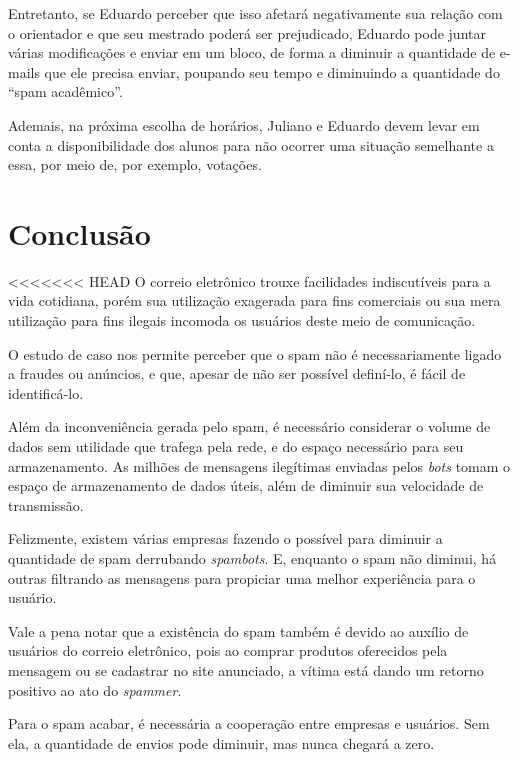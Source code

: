 \documentclass[a4paper,dvipdfm]{article}
\begin{document}
		Entretanto, se Eduardo perceber que isso afetará negativamente sua relação com o orientador e que seu mestrado poderá ser prejudicado, Eduardo pode juntar várias modificações e enviar em um bloco, de forma a diminuir a quantidade de e-mails que ele precisa enviar, poupando seu tempo e diminuindo a quantidade do ``spam acadêmico''.
		
		Ademais, na próxima escolha de horários, Juliano e Eduardo devem levar em conta a disponibilidade dos alunos para não ocorrer uma situação semelhante a essa, por meio de, por exemplo, votações.
		
\newpage
\section{Conclusão}
<<<<<<< HEAD
	O correio eletrônico trouxe facilidades indiscutíveis para a vida cotidiana, porém sua utilização exagerada para fins comerciais ou sua mera utilização para fins ilegais incomoda os usuários deste meio de comunicação.
	
	O estudo de caso nos permite perceber que o spam não é necessariamente ligado a fraudes ou anúncios, e que, apesar de não ser possível definí-lo, é fácil de identificá-lo.
	
	Além da inconveniência gerada pelo spam, é necessário considerar o volume de dados sem utilidade que trafega pela rede, e do espaço necessário para seu armazenamento.
	As milhões de mensagens ilegítimas enviadas pelos \emph{bots} tomam o espaço de armazenamento de dados úteis, além de diminuir sua velocidade de transmissão.
	
	Felizmente, existem várias empresas fazendo o possível para diminuir a quantidade de spam derrubando \emph{spambots}.
	E, enquanto o spam não diminui, há outras filtrando as mensagens para propiciar uma melhor experiência para o usuário.

	Vale a pena notar que a existência do spam também é devido ao auxílio de usuários do correio eletrônico, pois ao comprar produtos oferecidos pela mensagem ou se cadastrar no site anunciado, a vítima está dando um retorno positivo ao ato do \emph{spammer}.

	Para o spam acabar, é necessária a cooperação entre empresas e usuários. Sem ela, a quantidade de envios pode diminuir, mas nunca chegará a zero.

\newpage
\printglossaries
{}

\newpage



%
\end{document}
